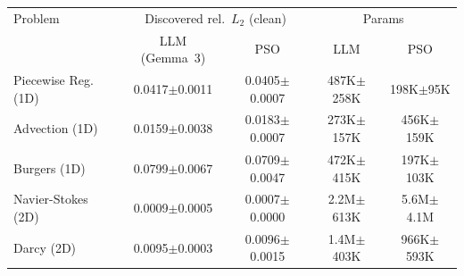 \begin{tabular}{lcccc}
\toprule
Problem & \multicolumn{2}{c}{Discovered rel.\ $L_2$ (clean)} & \multicolumn{2}{c}{Params} \\
 & LLM (Gemma~3) & PSO & LLM & PSO \\
\midrule
Piecewise Reg. (1D) & 0.0417$\pm$0.0011 & 0.0405$\pm$0.0007 & 487K$\pm$258K & 198K$\pm$95K \\
Advection (1D) & 0.0159$\pm$0.0038 & 0.0183$\pm$0.0007 & 273K$\pm$157K & 456K$\pm$159K \\
Burgers (1D) & 0.0799$\pm$0.0067 & 0.0709$\pm$0.0047 & 472K$\pm$415K & 197K$\pm$103K \\
Navier-Stokes (2D) & 0.0009$\pm$0.0005 & 0.0007$\pm$0.0000 & 2.2M$\pm$613K & 5.6M$\pm$4.1M \\
Darcy (2D) & 0.0095$\pm$0.0003 & 0.0096$\pm$0.0015 & 1.4M$\pm$403K & 966K$\pm$593K \\
\bottomrule
\end{tabular}